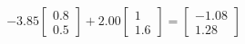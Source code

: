 \documentclass[preview]{standalone}
\begin{document}
\begin{align*}
-3.85 \begin{bmatrix} 0.8 \\ 0.5 \end{bmatrix} + 2.00 \begin{bmatrix} 1 \\ 1.6 \end{bmatrix} = \begin{bmatrix} -1.08 \\ 1.28 \end{bmatrix}
\end{align*}
\end{document}
